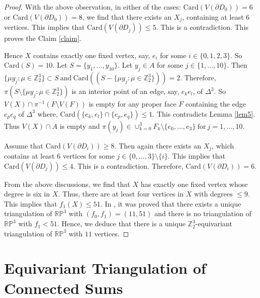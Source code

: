\documentclass[11pt]{amsart}
\numberwithin{equation}{section}
\theoremstyle{definition}
\def \bb{\mathbb}
\def \ZZ{{\bb{Z}}}
\begin{document}
\begin{proof}
With the above observation, in either of the cases:  $\mathrm{Card}(V(\partial{D_0}))=6$ or $\mathrm{Card}(V(\partial{D_0}))=8$, we find that there exists an $X_j$, containing at least $6$ vertices. This implies that $\mathrm{Card}(V(\partial{D_{j}})) \leq 5$.
This is a contradiction. This proves the 
 Claim \ref{claim}.


 


Hence $X$ contains exactly one fixed vertex, say, $e_i$ for some $i\in \{0,1,2,3\}$. So $\mathrm{Card}(S) = 10$. Let $S = \{y_1, \ldots, y_{10}\}$.
Let $y_j \in A$ for some $j \in \{1, \ldots, 10\}$. Then $\{\mu y_j : \mu\in \ZZ_2^3\} \subset S ~ \mbox{and} ~
\mathrm{Card}((S- \{\mu y_j : \mu\in \ZZ_2^3\})) = 2.$ Therefore, $\pi(S\setminus \{\mu y_j : \mu\in \ZZ_2^3\})$ is an interior point
of an edge, say, $e_ke_l$, of $\Delta^3$. So $V(X) \cap \pi^{-1}(F\setminus V(F))$ is empty for any proper
face $F$ containing the edge $e_pe_q$ of $\Delta^3$ where, $\mathrm{Card}(\{e_k,e_l\}\cap \{e_p,e_q\})\leq 1$. This contradicts Lemma \ref{lem5}.
Thus $V(X) \cap A$ is empty and $\pi(y_j) \in \cup_{k=0}^3 F_k \setminus\{e_0, \ldots, e_3\}~ \mbox{for} ~ j=1, \ldots, 10.$


Assume that $\mathrm{Card}( V(\partial{D_i})) \geq 8$. Then again there exists an $X_j$, which contains at least $6$ vertices for some $j \in \{0, \ldots, 3\}\setminus \{i\}$. This implies that $\mathrm{Card}(V(\partial{D_{j}})) \leq 4$. This is a contradiction. Therefore, $\mathrm{Card}( V(\partial{D_i}))=6$. 

From the above discussions, we find that $X$ has exactly one fixed vertex whose degree is six in $X$. Thus, there are at least four vertices in $X$ with degrees $\leq 9$. This implies that $f_1(X)\leq 51$. In \cite{LS}, it was proved that there exists a unique triangulation of $\mathbb{RP}^3$ with $(f_0,f_1)=(11,51)$ and there is no triangulation of $\mathbb{RP}^3$ with $f_1< 51$.
Hence, we deduce that there is a unique $\ZZ_2^3$-equivariant triangulation of $\mathbb{RP}^3$ with $11$ vertices.
\end{proof}





 \section{Equivariant Triangulation of Connected Sums}\label{sec:connectedsum}
\end{document}
